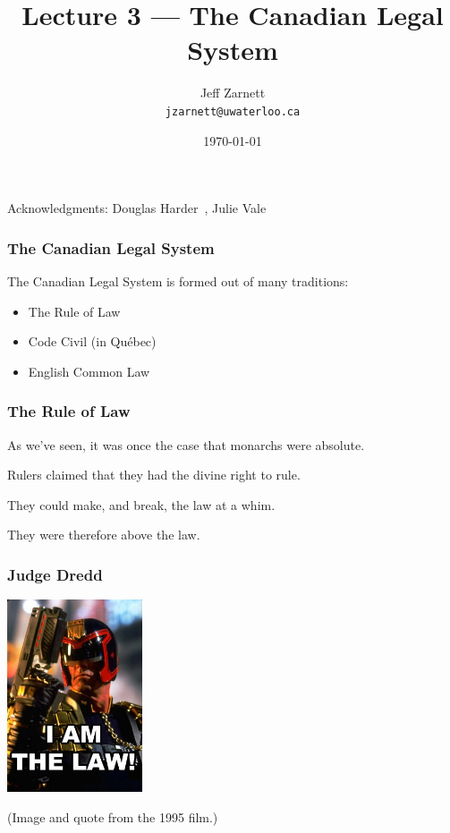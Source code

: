 

\title{Lecture 3 --- The Canadian Legal System }

\author{Jeff Zarnett \\ \small \texttt{jzarnett@uwaterloo.ca}}
\date{\today}




\begin{frame}
  \titlepage

\begin{center}
  \small{Acknowledgments: Douglas Harder~\cite{dwh}, Julie Vale~\cite{jv}}
  \end{center}
\end{frame}




\begin{frame}
\frametitle{The Canadian Legal System}

The Canadian Legal System is formed out of many traditions:

\begin{itemize}
	\item The Rule of Law
	\item Code Civil (in Qu\'ebec)
	\item English Common Law
\end{itemize}

\end{frame}



\begin{frame}
\frametitle{The Rule of Law}

As we've seen, it was once the case that monarchs were absolute.

Rulers claimed that they had the divine right to rule. 

They could make, and break, the law at a whim.

They were therefore above the law. 

\end{frame}



\begin{frame}
\frametitle{Judge Dredd}

\begin{center}
	\includegraphics[width=0.3\textwidth]{images/dredd.jpg}
\end{center}

(Image and quote from the 1995 film.)

\end{frame}



